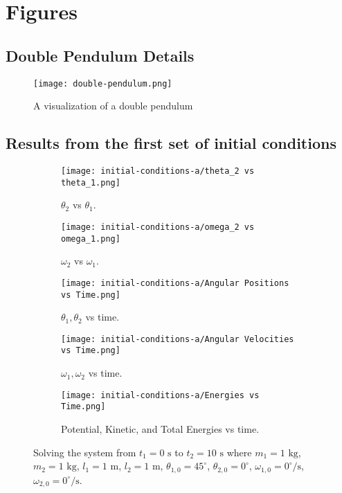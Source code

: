 \section{Figures}\label{sec:figures}

\subsection{Double Pendulum Details}\label{subsec:double-pendulum-details}
\begin{figure}[H]
    \centering
    \texttt{[image: double-pendulum.png]}
    \caption{A visualization of a double pendulum}
    \label{fig:1}
\end{figure}

\subsection{Results from the first set of initial conditions}\label{subsec:results-from-the-first-set-of-initial-conditions}
\begin{figure}[H]
    \centering
    \begin{subfigure}[b]{0.49\textwidth}
        \centering
        \texttt{[image: initial-conditions-a/theta\_2 vs theta\_1.png]}
        \caption{$\theta_2$ vs $\theta_1$.}
        \label{fig:2a}
    \end{subfigure}
    \hfill
    \begin{subfigure}[b]{0.49\textwidth}
        \centering
        \texttt{[image: initial-conditions-a/omega\_2 vs omega\_1.png]}
        \caption{$\omega_2$ vs $\omega_1$.}
        \label{fig:2b}
    \end{subfigure}
    \hfill
    \begin{subfigure}[b]{0.49\textwidth}
        \centering
        \texttt{[image: initial-conditions-a/Angular Positions vs Time.png]}
        \caption{$\theta_1, \theta_2$ vs time.}
        \label{fig:2c}
    \end{subfigure}
    \hfill
    \begin{subfigure}[b]{0.49\textwidth}
        \centering
        \texttt{[image: initial-conditions-a/Angular Velocities vs Time.png]}
        \caption{$\omega_1, \omega_2$ vs time.}
        \label{fig:2d}
    \end{subfigure}
    \hfill
    \begin{subfigure}[b]{0.49\textwidth}
        \centering
        \texttt{[image: initial-conditions-a/Energies vs Time.png]}
        \caption{Potential, Kinetic, and Total Energies vs time.}
        \label{fig:2e}
    \end{subfigure}
    \caption{Solving the system from $t_1 = 0\text{ s}$ to $t_2 = 10\text{ s}$ where $m_1 = 1\text{ kg}$, $m_2 = 1\text{ kg}$, $l_1 = 1\text{ m}$, $l_2 = 1\text{ m}$, $\theta_{1,0} = 45^\circ$, $\theta_{2,0} = 0^\circ$, $\omega_{1,0} = 0^\circ\text{/s}$, $\omega_{2,0} = 0^\circ\text{/s}$.}
    \label{fig:2}
\end{figure}

